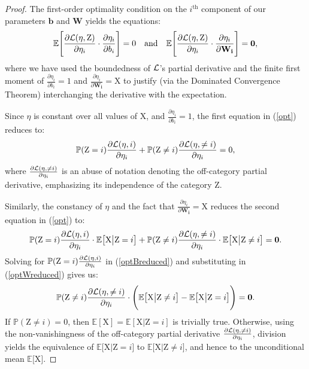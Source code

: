 \documentclass{article}
\theoremstyle{plain}
\theoremstyle{remark}
\newcommand{\E}{\mathbb E}
\theoremstyle{plain}
\theoremstyle{TheoremNum}
\newcommand{\rv}[1]{{\mathrm{#1}}}
\newcommand{\loss}{\color{black} \mathcal{L}}
\begin{document}
\begin{proof}
\label{app:necessity-proof}
    The first-order optimality condition on the $i^\text{th}$ component of our parameters $\mathbf b$ and $\mathbf W$ yields the equations:
    \begin{equation}\label{opt}
        \E \Bigg[ \frac {\partial \loss(\eta, \rv Z)} {\partial \eta_i} \cdot \frac {\partial \eta_i} {\partial b_i} \Bigg] = 0 \quad \text{and} \quad \E \Bigg[ \frac {\partial \loss(\eta, \rv Z)} {\partial \eta_i} \cdot \frac {\partial \eta_i} {\partial \mathbf{W_i}} \Bigg] = \mathbf{0},
    \end{equation}
    where we have used the boundedness of $\loss$'s partial derivative and the finite first moment of $\frac {\partial \eta_i} {\partial b_i} = 1$ and $\frac {\partial \eta_i} {\partial \mathbf{W_i}} = \rv X$ to justify (via the Dominated Convergence Theorem) interchanging the derivative with the expectation.

    Since $\eta$ is constant over all values of $\rv X$, and $\frac {\partial \eta_i} {\partial b_i} = 1$, the first equation in (\ref{opt}) reduces to:    
    \begin{equation} \label{optBreduced}
        \mathbb P(\rv Z=i) \frac {\partial \loss(\eta, i)} {\partial \eta_i} +
            \mathbb P(\rv Z \neq i) \frac {\partial \loss(\eta, \neq i)} {\partial \eta_i} = 0,
    \end{equation}
    where $\frac {\partial \loss(\eta, \neq i)} {\partial \eta_i}$ is an abuse of notation denoting the off-category partial derivative, emphasizing its independence of the category $\rv Z$.

    Similarly, the constancy of $\eta$ and the fact that $\frac {\partial \eta_i} {\partial \mathbf{W_i}} = \rv X$ reduces the second equation in (\ref{opt}) to:
    \begin{equation} \label{optWreduced}
        \mathbb P(\rv Z=i) \frac {\partial \loss(\eta, i)} {\partial \eta_i} \cdot \E \big[ \rv X \big| \rv Z = i \big] + \\
        \mathbb P(\rv Z \neq i) \frac {\partial \loss(\eta, \neq i)} {\partial \eta_i} \cdot \E \big[ \rv X \big| \rv Z \neq i \big]
        = \mathbf{0}.
    \end{equation}
    Solving for $\mathbb P(\rv Z = i) \frac {\partial \loss(\eta, i)} {\partial \eta_i}$ in (\ref{optBreduced}) and substituting in (\ref{optWreduced}) gives us:
    \begin{equation*}
        \mathbb P(\rv Z \neq i) \frac {\partial \loss(\eta, \neq i)} {\partial \eta_i} \cdot \Bigg(
                    \E \big[ \rv X \big| \rv Z \neq i \big] -
                    \E \big[ \rv X \big| \rv Z = i \big]
        \Bigg) = \mathbf{0}.
    \end{equation*}
    If $\mathbb P(\rv Z \neq i) = 0$, then $\E[\rv X] = \E[\rv X|\rv Z = i]$ is trivially true. Otherwise, using the non-vanishingness of the off-category partial derivative $\frac {\partial \loss(\eta, \neq i)} {\partial \eta_i}$, division yields the equivalence of $\E \big[ \rv X \big| \rv Z = i \big]$ to $\E \big[ \rv X \big| \rv Z \neq i \big]$, and hence to the unconditional mean $\E \big[ \rv X \big]$.
\end{proof}
\end{document}
